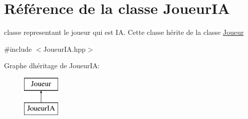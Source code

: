 \hypertarget{class_joueur_i_a}{}\section{Référence de la classe Joueur\+IA}
\label{class_joueur_i_a}


classe representant le joueur qui est IA. Cette classe hérite de la classe \hyperlink{class_joueur}{Joueur}  




{\ttfamily \#include $<$Joueur\+I\+A.\+hpp$>$}

Graphe d\textquotesingle{}héritage de Joueur\+IA\+:\begin{figure}[H]
\begin{center}
\leavevmode
\includegraphics[height=2.000000cm]{class_joueur_i_a}
\end{center}
\end{figure}
